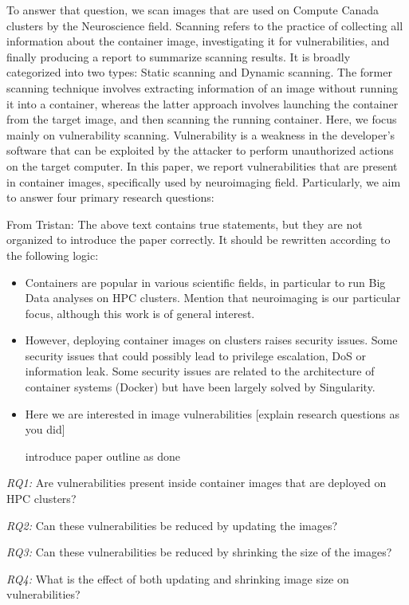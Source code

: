 \documentclass[a4paper,num-refs]{oup-contemporary}
\newcommand{\tristan}[1]{\color{blue}From Tristan: #1\color{black}}
\begin{document}
To answer that question, we scan images that are used on Compute
Canada clusters by the Neuroscience field. Scanning refers to the practice of
collecting all information about the container image, investigating it
for vulnerabilities, and finally producing a
report to summarize scanning results. It is broadly categorized into
two types: Static scanning and Dynamic scanning. The former scanning technique
involves extracting information of an image without running it into a container,
whereas the latter approach involves launching the container from the target image, and
then scanning the running container.
Here, we focus mainly on vulnerability scanning.
Vulnerability is a weakness in the developer's software that can be exploited
by the attacker to perform unauthorized actions on the target computer.
In this paper, we report vulnerabilities that are present in
container images, specifically used by neuroimaging field. Particularly,
we aim to answer four primary research questions:

\tristan{The above text contains true statements, but they are not organized 
to introduce the paper correctly. It should be rewritten according to the following logic:
\begin{itemize}
	\item Containers are popular in various scientific fields, in particular to run Big Data analyses on HPC clusters. Mention that neuroimaging is our particular focus, although this work is of general interest.
	\item However, deploying container images on clusters raises security issues. Some security issues that could possibly lead to privilege escalation, DoS or information leak. Some
	security issues are related to the architecture of container systems (Docker) but have been largely solved by Singularity.
	\item Here we are interested in image vulnerabilities [explain research questions as you did]
	\item [introduce paper outline as done]
\end{itemize}}

\textit{RQ1:} Are vulnerabilities present inside container images that are
deployed on HPC clusters?

\textit{RQ2:} Can these vulnerabilities be reduced by updating the images?

\textit{RQ3:} Can these vulnerabilities be reduced by shrinking the size of the images?

\textit{RQ4:} What is the effect of both updating
and shrinking image size on vulnerabilities?
\end{document}
